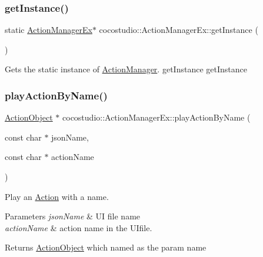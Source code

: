 \subsubsection{\texorpdfstring{get\+Instance()}{getInstance()}\hspace{0.1cm}{\footnotesize\ttfamily [2/2]}}
{\footnotesize\ttfamily static \hyperlink{classcocostudio_1_1ActionManagerEx}{Action\+Manager\+Ex}$\ast$ cocostudio\+::\+Action\+Manager\+Ex\+::get\+Instance (\begin{DoxyParamCaption}{ }\end{DoxyParamCaption})\hspace{0.3cm}{\ttfamily [static]}}

Gets the static instance of \hyperlink{classActionManager}{Action\+Manager}.  get\+Instance  get\+Instance \mbox{\label{classcocostudio_1_1ActionManagerEx_a801c1db6d848b9957c82739a5878cae0}} 
\subsubsection{\texorpdfstring{play\+Action\+By\+Name()}{playActionByName()}\hspace{0.1cm}{\footnotesize\ttfamily [1/4]}}
{\footnotesize\ttfamily \hyperlink{classcocostudio_1_1ActionObject}{Action\+Object} $\ast$ cocostudio\+::\+Action\+Manager\+Ex\+::play\+Action\+By\+Name (\begin{DoxyParamCaption}\item[{const char $\ast$}]{json\+Name,  }\item[{const char $\ast$}]{action\+Name }\end{DoxyParamCaption})}

Play an \hyperlink{classAction}{Action} with a name.


\begin{DoxyParams}{Parameters}
{\em json\+Name} & UI file name\\
\hline
{\em action\+Name} & action name in the U\+Ifile.\\
\hline
\end{DoxyParams}
\begin{DoxyReturn}{Returns}
\hyperlink{classcocostudio_1_1ActionObject}{Action\+Object} which named as the param name 
\end{DoxyReturn}
\mbox{\label{classcocostudio_1_1ActionManagerEx_ad26c073fce28a6fcddf8f42217a7e9ab}} 
